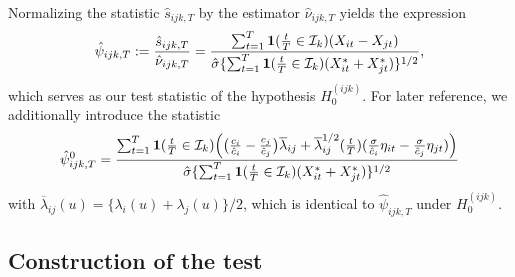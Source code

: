 \documentclass[a4paper,11pt]{article}
\numberwithin{equation}{section}
\begin{document}
Normalizing the statistic $\hat{s}_{ijk,T}$ by the estimator $\hat{\nu}_{ijk,T}$ yields the expression 
\begin{equation*}
\hat{\psi}_{ijk,T} := \frac{\hat{s}_{ijk,T}}{\hat{\nu}_{ijk,T}} = \frac{\sum\nolimits_{t=1}^T \boldsymbol{1}(\frac{t}{T} \in \mathcal{I}_k) (X_{it} - X_{jt})}{ \hat{\sigma}\{ \sum\nolimits_{t=1}^T \boldsymbol{1}(\frac{t}{T} \in \mathcal{I}_k) (X^*_{it} + X^*_{jt}) \}^{1/2}}, 
\end{equation*}
which serves as our test statistic of the hypothesis $H_0^{(ijk)}$. For later reference, we additionally introduce the statistic 
\begin{equation*}
\hat{\psi}_{ijk,T}^{ 0} = \frac{\sum\nolimits_{t=1}^T \boldsymbol{1}(\frac{t}{T} \in \mathcal{I}_k) \Big(\big( \frac{c_i}{\hat{c}_i} - \frac{c_j}{\hat{c}_j} \big)\overline{\lambda}_{ij} + \overline{\lambda}_{ij}^{1/2}(\frac{t}{T}) (\frac{\sigma}{\hat{c}_i} \eta_{it} - \frac{\sigma}{\hat{c}_j} \eta_{jt}) \Big)}{ \hat{\sigma} \{ \sum\nolimits_{t=1}^T \boldsymbol{1}(\frac{t}{T} \in \mathcal{I}_k) (X^*_{it} + X^*_{jt}) \}^{1/2}}
\end{equation*}
with $\overline{\lambda}_{ij}(u) = \{ \lambda_i(u) + \lambda_j(u) \}/2$, which is identical to $\hat{\psi}_{ijk,T}$ under $H_0^{(ijk)}$. 




\subsection{Construction of the test} 
\end{document}
